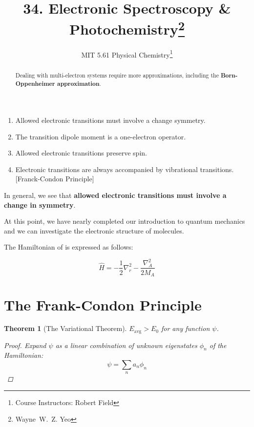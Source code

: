 \documentclass[a4paper]{tufte-handout}
\title{34. Electronic Spectroscopy \& Photochemistry\thanks{Wayne~W.~Z. Yeo}}
\author[MIT 5.61]{\textnormal{MIT 5.61} Physical Chemistry\thanks{Course Instructors: Robert Field}}
\newtheorem{theorem}{Theorem}
\theoremstyle{definition}
\begin{document}
\maketitle%

\begin{abstract}
\noindent
Dealing with multi-electron systems require more approximations, including the \textbf{Born-Oppenheimer approximation}.

\end{abstract}

\begin{enumerate}
  \item Allowed electronic transitions must involve a change symmetry.
  \item The transition dipole moment is a one-electron operator.
  \item Allowed electronic transitions preserve spin.
  \item Electronic transitions are always accompanied by vibrational transitions. [Franck-Condon Principle]
\end{enumerate}


In general, we see that \textbf{allowed electronic transitions must involve a change in symmetry}.

At this point, we have nearly completed our introduction to quantum mechanics 
and we can investigate the electronic structure of molecules.

The Hamiltonian of  is expressed as follows:

\begin{equation}
  \hat{H} = -\frac{1}{2}\nabla^2_r - \frac{\nabla^2_A}{2M_A}
\end{equation}

\section{The Frank-Condon Principle}

\begin{theorem}[The Variational Theorem] $E_{\mathrm{avg}} > E_0$ for any function $\psi$. 

  \begin{proof}
    Expand $\psi$ as a linear combination of unknown eigenstates $\phi_n$ of the Hamiltonian:
    \begin{equation*}
      \psi = \sum_n a_n \phi_n
    \end{equation*}
  \end{proof}
  
\end{theorem}
\end{document}
